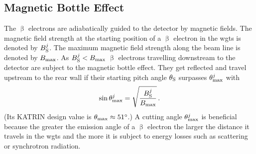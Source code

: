 \subsection{Magnetic Bottle Effect}
The $\upbeta$ electrons are adiabatically guided to the detector by magnetic fields. The magnetic field strength at the starting position of a $\upbeta$ electron in the \gls{wgts} is denoted by $B^j_\mathrm{S}$. The maximum magnetic field strength along the beam line is denoted by $B_\mathrm{max}$. As $B^j_\mathrm{S}<B_\mathrm{max}$ $\upbeta$ electrons travelling downstream to the detector are subject to the magnetic bottle effect. They get reflected and travel upstream to the rear wall if their starting pitch angle $\theta_\mathrm{S}$ surpasses $\theta_\mathrm{max}^j$ with
\begin{equation}
    \label{eq:thetaMax}
    \sin\theta_\mathrm{max}^j = \sqrt{\frac{B^j_\mathrm{S}}{B_\mathrm{max}}} \text{\,.}
\end{equation}
(Its KATRIN design value is $\theta_\mathrm{max}\approx \SI{51}{\degree}$.) A cutting angle $\theta_\mathrm{max}^j$ is beneficial because the greater the emission angle of a $\upbeta$ electron the larger the distance it travels in the \gls{wgts} and the more it is subject to energy losses such as scattering or synchrotron radiation.

